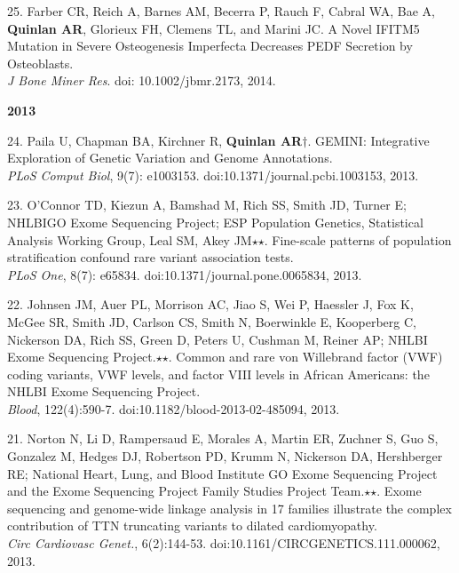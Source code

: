 \documentclass[margin,line]{cv}
\begin{document}
\begin{resume}
\begin{list}{*}{}
    \item[25.] Farber CR, Reich A, Barnes AM, Becerra P, Rauch F, Cabral WA, Bae A, \textbf{Quinlan AR}, Glorieux FH, Clemens TL, and Marini JC.
    A Novel IFITM5 Mutation in Severe Osteogenesis Imperfecta Decreases PEDF Secretion by Osteoblasts.\\
    \emph{J Bone Miner Res}. doi: 10.1002/jbmr.2173, 2014.
    
    \end{list}

    \textbf{2013} \\
    \begin{list}{*}{}
    
    \item[24.] Paila U, Chapman BA, Kirchner R, \textbf{Quinlan AR}$\dagger$.
    GEMINI: Integrative Exploration of Genetic Variation and Genome Annotations.\\
    \emph{PLoS Comput Biol}, 9(7): e1003153. doi:10.1371/journal.pcbi.1003153, 2013.

    \item[23.] O'Connor TD, Kiezun A, Bamshad M, Rich SS, Smith JD, Turner E; NHLBIGO Exome Sequencing Project; ESP Population Genetics, Statistical Analysis Working Group, Leal SM, Akey JM$\star$$\star$. Fine-scale patterns of population stratification confound rare variant association tests.\\
    \emph{PLoS One}, 8(7): e65834. doi:10.1371/journal.pone.0065834, 2013.

    \item[22.] Johnsen JM, Auer PL, Morrison AC, Jiao S, Wei P, Haessler J, Fox K, McGee SR, Smith JD, Carlson CS, Smith N, Boerwinkle E, Kooperberg C, Nickerson DA, Rich SS, Green D, Peters U, Cushman M, Reiner AP; NHLBI Exome Sequencing Project.$\star$$\star$. Common and rare von Willebrand factor (VWF) coding variants, VWF levels, and factor VIII levels in African Americans: the NHLBI Exome Sequencing Project.\\
    \emph{Blood}, 122(4):590-7. doi:10.1182/blood-2013-02-485094, 2013.

    \item[21.] Norton N, Li D, Rampersaud E, Morales A, Martin ER, Zuchner S, Guo S, Gonzalez M, Hedges DJ, Robertson PD, Krumm N, Nickerson DA, Hershberger RE; National Heart, Lung, and Blood Institute GO Exome Sequencing Project and the Exome Sequencing Project Family Studies Project Team.$\star$$\star$. Exome sequencing and genome-wide linkage analysis in 17 families illustrate the complex contribution of TTN truncating variants to dilated cardiomyopathy.\\
    \emph{Circ Cardiovasc Genet.}, 6(2):144-53. doi:10.1161/CIRCGENETICS.111.000062, 2013.
	

\end{list}
\end{resume}
\end{document}
